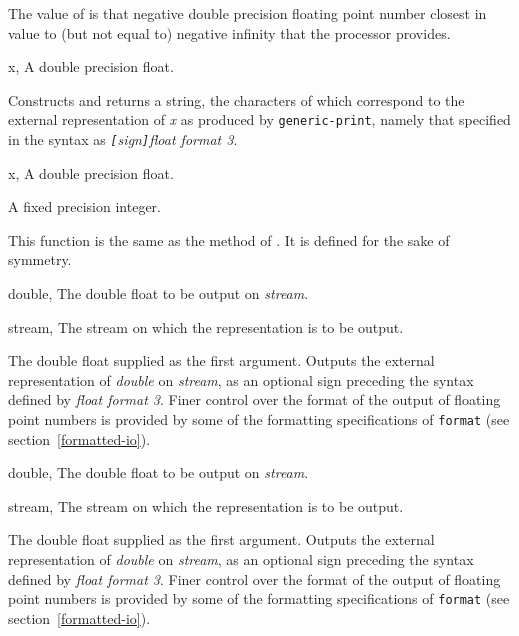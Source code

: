 \begin{optDefinition}
%
\remarks%
The value of  is that negative double
precision floating point number closest in value to (but not equal to) negative
infinity that the processor provides.

%
\begin{specargs}
    \item[x, \classref{double-float}] A double precision float.
\end{specargs}
%
\result%
Constructs and returns a string, the characters of which correspond to the
external representation of {\em x\/} as produced by {\tt generic-print}, namely
that specified in the syntax as {\em {\tt[}sign{\tt]}float format 3}.

%
\begin{specargs}
    \item[x, \classref{double-float}] A double precision float.
\end{specargs}
%
\result%
A fixed precision integer.

\remarks%
This function is the same as the  method of
.  It is defined for the sake of symmetry.

%
\begin{specargs}
    \item[double, \classref{double-float}]%
    The double float to be output on {\em stream}.
    \item[stream, \classref{stream}]%
    The stream on which the representation is to be output.
\end{specargs}
%
\result%
The double float supplied as the first argument.
%
\remarks%
Outputs the external representation of {\em double\/} on {\em stream}, as an
optional sign preceding the syntax defined by {\em float format 3}.  Finer
control over the format of the output of floating point numbers is provided by
some of the formatting specifications of {\tt format} (see
section~\ref{formatted-io}).

%
\begin{specargs}
    \item[double, \classref{double-float}]%
    The double float to be output on {\em stream}.
    \item[stream, \classref{stream}]%
    The stream on which the representation is to be output.
\end{specargs}
%
\result%
The double float supplied as the first argument.
%
\remarks%
Outputs the external representation of {\em double\/} on {\em stream}, as an
optional sign preceding the syntax defined by {\em float format 3}.  Finer
control over the format of the output of floating point numbers is provided by
some of the formatting specifications of {\tt format} (see
section~\ref{formatted-io}).
%
\end{optDefinition}
